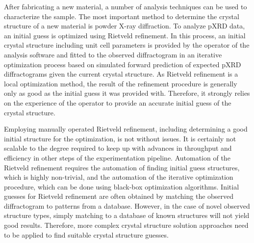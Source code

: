 After fabricating a new material, a number of analysis techniques can be used to characterize the sample.
The most important method to determine the crystal structure of a new material is powder X-ray diffraction. 
To analyze pXRD data, an initial guess is optimized using Rietveld refinement. In this process, an initial crystal structure including unit cell parameters is provided by the operator of the analysis software and fitted to the observed diffractogram in an iterative optimization process based on simulated forward prediction of expected pXRD diffractograms given the current crystal structure.
As Rietveld refinement is a local optimization method, the result of the refinement procedure is generally only as good as the initial guess it was provided with.
Therefore, it strongly relies on the experience of the operator to provide an accurate initial guess of the crystal structure.

Employing manually operated Rietveld refinement, including determining a good initial structure for the optimization, is not without issues.
It is certainly not scalable to the degree required to keep up with advances in throughput and efficiency in other steps of the experimentation pipeline.
Automation of the Rietveld refinement requires the automation of finding initial guess structures, which is highly non-trivial, and the automation of the iterative optimization procedure, which can be done using black-box optimization algorithms.
Initial guesses for Rietveld refinement are often obtained by matching the observed diffractogram to patterns from a database.
However, in the case of novel observed structure types, simply matching to a database of known structures will not yield good results. Therefore, more complex crystal structure solution approaches need to be applied to find suitable crystal structure guesses.

